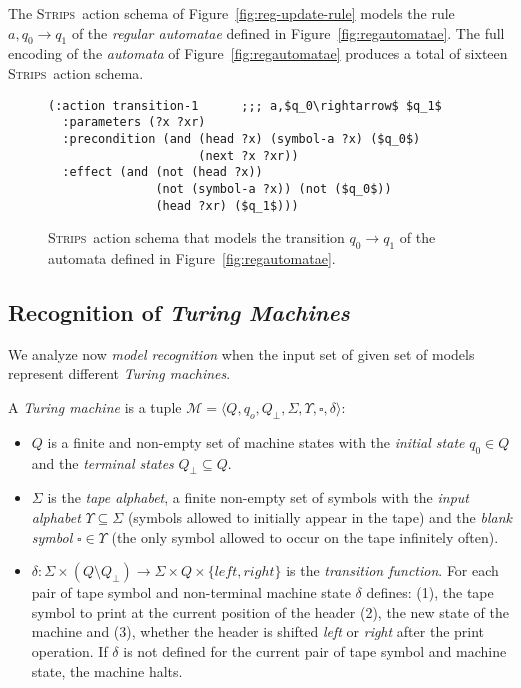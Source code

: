\documentclass[letterpaper]{article} %
\newcommand{\tup}[1]{{\langle #1 \rangle}}
\newcommand{\strips}{\textsc{Strips}}     %
\begin{document}
The \strips\ action schema of Figure~\ref{fig:reg-update-rule} models the rule $a,q_0\rightarrow q_1$ of the {\em regular automatae} defined in Figure~\ref{fig:regautomatae}. The full encoding of the {\em automata} of Figure~\ref{fig:regautomatae} produces a total of sixteen \strips\ action schema.

\begin{figure}
\begin{scriptsize}
\begin{lstlisting}
(:action transition-1      ;;; a,$q_0\rightarrow$ $q_1$
  :parameters (?x ?xr)
  :precondition (and (head ?x) (symbol-a ?x) ($q_0$)
                     (next ?x ?xr))
  :effect (and (not (head ?x)) 
               (not (symbol-a ?x)) (not ($q_0$))
               (head ?xr) ($q_1$)))
\end{lstlisting}
\end{scriptsize}
 \caption{\small \strips\ action schema that models the transition $q_0\rightarrow q_1$ of the automata defined in Figure~\ref{fig:regautomatae}.}
\label{fig:regupdate-rule}
\end{figure}

\subsection{Recognition of {\em Turing Machines}}
We analyze now {\em model recognition} when the input set of given set of models represent different {\em Turing machines}.

A {\em Turing machine} is a tuple $\mathcal{M}=\tup{Q,q_o,Q_{\bot},\Sigma,\Upsilon,\square,\delta}$:
\begin{itemize}
\item $Q$ is a finite and non-empty set of machine states with the {\em initial state} $q_0\in Q$ and the {\em terminal states} $Q_{\bot}\subseteq Q$.  
\item $\Sigma$ is the {\em tape alphabet}, a finite non-empty set of symbols with the {\em input alphabet} $\Upsilon\subseteq\Sigma$ (symbols allowed to initially appear in the tape) and the {\em blank symbol} $\square\in\Upsilon$ (the only symbol allowed to occur on the tape infinitely often).
\item $\delta: \Sigma\times (Q\setminus Q_{\bot}) \rightarrow \Sigma\times Q\times\{left,right\}$ is the {\em transition function}. For each pair of tape symbol and non-terminal machine state $\delta$ defines: (1), the tape symbol to print at the current position of the header (2), the new state of the machine and (3), whether the header is shifted {\em left} or {\em right} after the print operation. If $\delta$ is not defined for the current pair of tape symbol and machine state, the machine halts.
\end{itemize}
\end{document}
